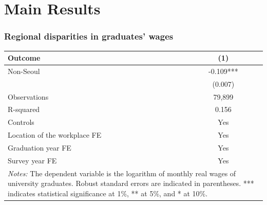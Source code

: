 \documentclass[aspectratio=169,xcolor=dvipsnames,handout]{beamer}
\begin{document}
\section{Main Results}%
\begin{frame}
    \frametitle{Regional disparities in graduates' wages}
    \begin{table}[ht]
        \centering
        \small
        \begin{tabular}{lc}
        \toprule
        \textbf{Outcome}             & \textbf{(1)} \\
        \midrule
        Non-Seoul                    & -0.109***    \\
                                     & (0.007)      \\
        \midrule
        Observations                 & 79,899       \\
        R-squared                    & 0.156        \\
        Controls                     & Yes          \\
        Location of the workplace FE & Yes          \\
        Graduation year FE           & Yes          \\
        Survey year FE               & Yes          \\
        \bottomrule
        \multicolumn{2}{p{6cm}}{\tiny\textit{Notes:} The dependent variable is the logarithm of monthly real wages of university graduates\@. Robust standard errors are indicated in parentheses. *** indicates statistical significance at 1\%, ** at 5\%, and * at 10\%.} \\
        \end{tabular}
    \end{table}
\end{frame}
\end{document}
